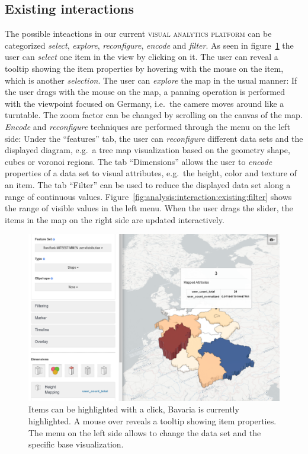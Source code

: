 \documentclass{article}
\newcommand{\visan}{\textsc{visual analytics platform}}
\begin{document}
\subsection{Existing interactions}
The possible inteactions in our current \visan{} can be categorized \emph{select}, \emph{explore}, \emph{reconfigure}, \emph{encode} and \emph{filter}.
As seen in figure~\ref{fig:analysis:interaction:existing} the user can \emph{select} one item in the view by clicking on it.
The user can reveal a tooltip showing the item properties by hovering with the mouse on the item, which is another \emph{selection}.
The user can \emph{explore} the map in the usual manner:
If the user drags with the mouse on the map, a panning operation is performed with the viewpoint focused on Germany, i.e.\ the camere moves around like a turntable.
The zoom factor can be changed by scrolling on the canvas of the map.
\emph{Encode} and \emph{reconfigure} techniques are performed through the menu on the left side:
Under the ``features'' tab, the user can \emph{reconfigure} different data sets and the displayed diagram, e.g.\ a tree map visualization based on the geometry shape, cubes or voronoi regions.
The tab ``Dimensions'' allows the user to \emph{encode} properties of a data set to visual attributes, e.g.\ the height, color and texture of an item.
The tab ``Filter'' can be used to reduce the displayed data set along a range of continuous values.
Figure~\ref{fig:analysis:interaction:existing:filter} shows the range of visible values in the left menu.
When the user drags the slider, the items in the map on the right side are updated interactively.

\begin{figure}[h!]
  \centering
  \includegraphics[width=\textwidth]{images/existing-interactions.png}
  \caption{
    Items can be highlighted with a click, Bavaria is currently highlighted.
    A mouse over reveals a tooltip showing item properties.
    The menu on the left side allows to change the data set and the specific base visualization.}
  \label{fig:analysis:interaction:existing}
\end{figure}
\end{document}
